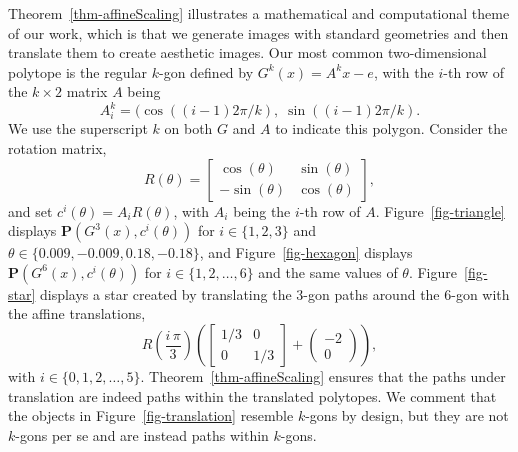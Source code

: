 \documentclass{article}
\def\bP{\mathbf{P}}
\begin{document}
Theorem~\ref{thm-affineScaling} illustrates a mathematical and computational
theme of our work, which is that we generate images with standard
geometries and then translate them to create aesthetic images. Our most
common two-dimensional polytope is the regular $k$-gon defined by $G^k(x) = A^k x - e$,
with the $i$-th row of the $k \times 2$ matrix $A$ being
\[
A^k_i = (\cos((i-1)2\pi/k), \; \sin((i-1)2\pi/k).
\]
We use the superscript $k$ on both $G$ and $A$ to indicate this polygon.
Consider the rotation matrix,
\[
R(\theta) = \left[ \begin{array}{rr}
    \cos(\theta) & \sin(\theta) \\[2pt] -\sin(\theta) & \cos(\theta)
    \end{array} \right],
\]
and set $c^i(\theta) = A_i R(\theta)$, with $A_i$ being the $i$-th
row of $A$. Figure~\ref{fig-triangle} displays $\bP(G^3(x), c^i(\theta))$
for $i \in \{1, 2, 3\}$ and $\theta \in \{ 0.009, -0.009, 0.18, -0.18\}$,
and Figure~\ref{fig-hexagon} displays $\bP(G^6(x), c^i(\theta))$
for $i \in \{1, 2, \ldots, 6 \}$ and the same values of $\theta$.
Figure~\ref{fig-star} displays a star created by translating
the $3$-gon paths around the $6$-gon with the affine translations,
\[
R\left( \frac{i\,\pi}{3} \right) \left(
    \left[ \begin{array}{cc} 1/3 & 0 \\ 0 & 1/3 \end{array} \right]
    + \left( \begin{array}{r} -2 \\ 0 \end{array} \right) \right),
\]
with $i \in \{0, 1, 2, \ldots, 5\}$. Theorem~\ref{thm-affineScaling} ensures 
that the paths under translation  are indeed paths within the 
translated polytopes. We comment that the objects in 
Figure~\ref{fig-translation} resemble $k$-gons by design, but they 
are not $k$-gons per se and are instead paths within $k$-gons.
\end{document}
